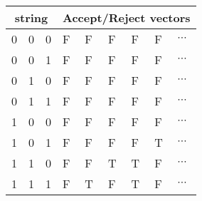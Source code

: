 \documentclass[border=3.14159]{standalone}
\begin{document}
\begin{tabular}{lll|llllll}
	\toprule
	\multicolumn{3}{c|}{string} & \multicolumn{6}{c}{Accept/Reject vectors} \\ \hline
	0 & 0 & 0 & F & F & F & F & F & $\cdots$ \\
	0 & 0 & 1 & F & F & F & F & F & $\cdots$ \\
	0 & 1 & 0 & F & F & F & F & F & $\cdots$ \\
	0 & 1 & 1 & F & F & F & F & F & $\cdots$ \\
	1 & 0 & 0 & F & F & F & F & F & $\cdots$ \\
	1 & 0 & 1 & F & F & F & F & T & $\cdots$ \\
	1 & 1 & 0 & F & F & T & T & F & $\cdots$ \\
	1 & 1 & 1 & F & T & F & T & F & $\cdots$ \\
	\bottomrule
\end{tabular}
\end{document}
